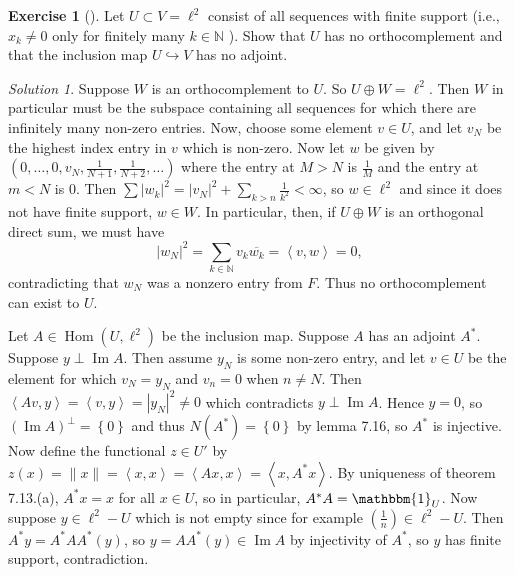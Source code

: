 \documentclass[reqno]{amsart}
\theoremstyle{definition}
\newtheorem{exercise}[theorem]{Exercise}
\theoremstyle{remark}
\newtheorem*{solution}{Solution}
\DeclareMathOperator{\Ima}{Im}
\DeclareMathOperator{\Hom}{Hom}
\begin{document}
    \begin{exercise}[]
        Let $U \subset V = \ell^2 $ consist of all sequences with finite
        support (i.e., $x_k \neq 0$ only for finitely many $k \in \mathbb{N}
        $ ).
        Show that $U$ has no orthocomplement and that the inclusion
        map $U \hookrightarrow V$ has no adjoint.
    \end{exercise}


    \begin{solution}
        Suppose $W$ is an orthocomplement to $U$.
        So $U \oplus W = \ell^2$. Then $W$ in particular must
        be the subspace containing all sequences
        for which there are infinitely many non-zero entries.
        Now, choose some element 
        $v \in U$, and let
        $v_N$ be the highest index entry in $v$ which is
        non-zero. Now let $w$ be given by
        $\left( 0, \ldots, 0, v_N, \frac{1}{N+1},
        \frac{1}{N+2}, \ldots \right) $ where
        the entry at $M > N$ is $\frac{1}{M}$ and
        the entry at $m < N$ is $0$. Then
        $\sum \left| w_k \right|^2 =
        \left| v_N \right|^2 + \sum_{k > n} \frac{1}{k^2} < 
        \infty $, so
        $w \in \ell^2$ and since it does not have finite support,
        $w \in W$. In particular, then, if
        $U \oplus W$ is an orthogonal direct sum, we must have
        \[
        \left| w_N \right|^2 = 
        \sum_{k \in \mathbb{N} } v_k \overline{w_k}
        = \left<v, w \right> = 0,
        \] 
        contradicting that $w_N$ was a nonzero entry from
        $F$. Thus no orthocomplement can exist
        to $U$.

        Let $A \in \Hom (U , \ell^2)$ be the inclusion map.
        Suppose $A$ has an adjoint $A^{*}$. Suppose
        $y \perp \Ima A$. Then assume $y_N$ is some
        non-zero entry, and let
        $v \in U$ be the element for which
        $v_N = y_N$ and $v_n = 0$ when $n \neq N$. Then
        $\left< Av, y \right> = 
        \left<v , y \right> = 
        \left| y_N \right|^2 \neq 0$ which
        contradicts $y \perp \Ima A$. Hence
        $y = 0$, so
        $\left( \Ima A \right)^{\perp} = \left\{ 0 \right\} $
        and thus $N \left( A^{*} \right) = 
        \left\{ 0 \right\} $ by lemma 7.16, so
        $A^{*}$ is injective.
        Now define the functional
        $z \in U'$ by $z(x) = \|x\|=
        \left< x,x \right> = \left<A x , x \right>
        = \left<x, A^{*}x \right>$. By uniqueness of
        theorem 7.13.(a), $A^{*}x = x$ for all
        $x \in U$, so in particular,
        $A^{*} A = \mathbbm{1}_U$. Now suppose
        $y \in \ell^2 - U$ which is not empty since
        for example $\left( \frac{1}{n} \right) \in 
        \ell^2 - U$. Then $A^{*} y =
        A^{*} A A^{*}(y)$, so
        $y = A A^{*} (y) \in \Ima A$ by injectivity of
        $A^{*}$, so
        $y$ has finite support, contradiction.
    \end{solution}














\end{document}
